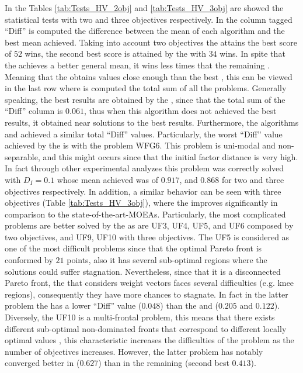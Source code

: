 In the Tables \ref{tab:Tests_HV_2obj} and \ref{tab:Tests_HV_3obj} are showed the statistical tests with two and three objectives respectively.
%
In the column tagged ``Diff'' is computed the difference between the mean of each algorithm and the best mean achieved.
%
Taking into account two objectives the \VSDMOEA{} attains the best score of $52$ wins, the second best score is attained by the \RMOEA{} with $34$ wins.
%
In spite that the \NSGAII{} achieves a better general mean, it wins less times that the remaining \MOEAS{}.
%
Meaning that the \NSGAII{} obtains values close enough than the best \MOEA{}, this can be viewed in the last row where is computed the total sum of all the problems.
%
Generally speaking, the best results are obtained by the \VSDMOEA{}, since that the total sum of the ``Diff'' column is $0.061$, thus when this algorithm does not achieved the best results, it obtained near solutions to the best results.
%
Furthermore, the algorithms \RMOEA{} and \MOEAD{} achieved a similar total ``Diff'' values.
%
Particularly, the worst ``Diff'' value achieved by the \VSDMOEA{} is with the problem WFG6.
%
This problem is uni-modal and non-separable, and this might occurs since that the initial factor distance is very high.
%
In fact through other experimental analyzes this problem was correctly solved with $D_I=0.1$ whose mean achieved  was of $0.917$, and $0.868$ for two and three objectives respectively.
%
In addition, a similar behavior can be seen with three objectives (Table \ref{tab:Tests_HV_3obj}), where the \VSDMOEA{} improves significantly in comparison to the state-of-the-art-MOEAs.
%
Particularly, the most complicated problems are better solved by the \VSDMOEA{} as are UF3, UF4, UF5, and UF6 composed by two objectives, and UF9, UF10 with three objectives.
%
The UF5 is considered as one of the most difficult problems since that the optimal Pareto front is conformed by $21$ points, also it has several sub-optimal regions where the solutions could suffer stagnation. 
%
Nevertheless, since that it is a disconnected Pareto front, the \MOEAS{} that considers weight vectors faces several difficulties (e.g. knee regions), consequently they have more chances to stagnate.
%
In fact in the latter problem the \NSGAII{} has a lower ``Diff'' value ($0.048$) than the \MOEAD{} and \RMOEA{} ($0.205$ and $0.122$).
%
Diversely, the UF10 is a multi-frontal problem, this means that there exists different sub-optimal non-dominated fronts that correspond to different locally optimal values \cite{huband2006review}, this characteristic increases the difficulties of the problem as the number of objectives increases.
%
However, the latter problem has notably converged better in \VSDMOEA{} ($0.627$) than in the remaining \MOEAS{} (second best $0.413$).
%


